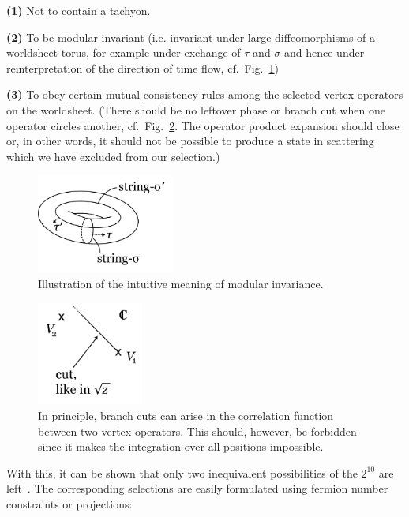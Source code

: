 \documentclass[12pt]{article}
\numberwithin{equation}{section}
\begin{document}
\noindent
{\bf (1)} Not to contain a tachyon.

\noindent
{\bf (2)} To be modular invariant (i.e. invariant under large diffeomorphisms of a worldsheet torus, for example under exchange of $\tau$ and $\sigma$ and hence under reinterpretation of the direction of time flow, cf.~Fig.~\ref{mins})

\noindent
{\bf (3)} To obey certain mutual consistency rules among the selected vertex operators on the worldsheet. (There should be no leftover phase or branch cut when one operator circles another, cf.~Fig.~\ref{bcu}. The operator product expansion should close or, in other words, it should not be possible to produce a state in scattering which we have excluded from our selection.)

\begin{figure}[ht]
\begin{center} 
\includegraphics[width=4.5cm]{min.png}
\caption{Illustration of the intuitive meaning of modular invariance.}
\label{mins} 
\end{center}
\end{figure}

\begin{figure}[ht]
\begin{center} 
\includegraphics[width=3.5cm]{bcu.png}
\caption{In principle, branch cuts can arise in the correlation function between two vertex operators. This should, however, be forbidden since it makes the integration over all positions impossible.}
\label{bcu} 
\end{center}
\end{figure}

With this, it can be shown that only two inequivalent possibilities of the $2^{10}$ are left~\cite{Polchinski:1998rq}. The corresponding selections are easily formulated using fermion number constraints or projections:
\end{document}
